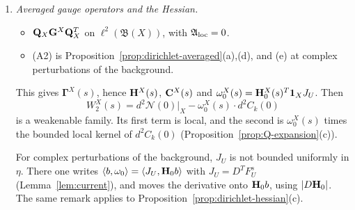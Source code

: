 \begin{enumerate}[label=(L\arabic*)]
\begin{itemize}
  \end{itemize}
  The result is $\bG^X(s)$, together with $D\bG^X(s)$, $\bG^X(s)D^T$ and $D\bG^X(s)D^T$.
\item \emph{Averaged gauge operators and the Hessian.}
  \begin{itemize}
  \item $\mathbf Q_X\mathbf G^X\mathbf Q_X^T$ on $\ell^2(\mathfrak B(X))$, with $\mathfrak A_{\rm loc}=0$.
  \item (A2) is Proposition~\ref{prop:dirichlet-averaged}(a),(d), and (e) at complex perturbations of the background.
  \end{itemize}
  This gives $\boldsymbol\Gamma^X(s)$, hence $\mathbf H^X(s)$, $\mathbf C^X(s)$ and $\omega_0^X(s)=\mathbf H_0^X(s)^T\mathbf 1_XJ_U$. Then
  \[
  W_2^X(s)=d^2\mathcal N(0)\big|_X-\omega_0^X(s)\cdot d^2C_k(0)
  \]
  is a weakenable family. Its first term is local, and the second is $\omega_0^X(s)$ times the bounded local kernel of $d^2C_k(0)$ (Proposition~\ref{prop:Q-expansion}(c)).

  For complex perturbations of the background, $J_U$ is not bounded uniformly in $\eta$. There one writes $\langle b,\omega_0\rangle=\langle J_U,\mathbf H_0b\rangle$ with $J_U=D^TF^s_U$ (Lemma~\ref{lem:current}), and moves the derivative onto $\mathbf H_0b$, using $|D\mathbf H_0|$. The same remark applies to Proposition~\ref{prop:dirichlet-hessian}(c).


\end{enumerate}

